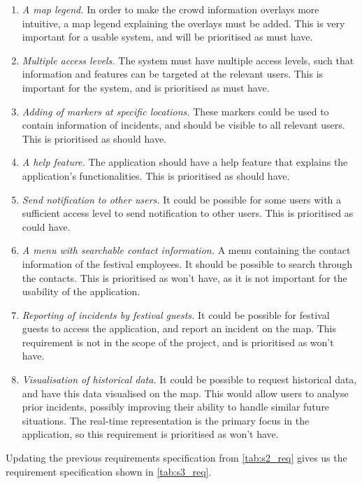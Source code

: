 \begin{enumerate}
    \item \emph{A map legend.} In order to make the crowd information overlays more intuitive, a map legend explaining the overlays must be added. This is very important for a usable system, and will be prioritised as must have.
    \item \emph{Multiple access levels.} The system must have multiple access levels, such that information and features can be targeted at the relevant users. This is important for the system, and is prioritised as must have.
    \item \emph{Adding of markers at specific locations.} These markers could be used to contain information of incidents, and should be visible to all relevant users. This is prioritised as should have.
    \item \emph{A help feature.} The application should have a help feature that explains the application's functionalities. This is prioritised as should have.
    \item \emph{Send notification to other users.} It could be possible for some users with a sufficient access level to send notification to other users. This is prioritised as could have.
    \item \emph{A menu with searchable contact information.} A menu containing the contact information of the festival employees. It should be possible to search through the contacts. This is prioritised as won't have, as it is not important for the usability of the application.
    \item \emph{Reporting of incidents by festival guests.} It could be possible for festival guests to access the application, and report an incident on the map. This requirement is not in the scope of the project, and is prioritised as won't have.
    \item \emph{Visualisation of historical data.} It could be possible to request historical data, and have this data visualised on the map. This would allow users to analyse prior incidents, possibly improving their ability to handle similar future situations. The real-time representation is the primary focus in the application, so this requirement is prioritised as won't have.
\end{enumerate}

Updating the previous requirements specification from \cref{tab:s2_req} gives us the requirement specification shown in \cref{tab:s3_req}.

